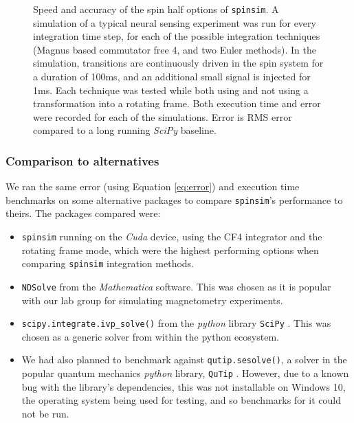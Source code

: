 \documentclass{jors}
\begin{document}
\begin{figure}[h!]
\begin{subfigure}[b]{0.475\textwidth}
					\caption{}
					\label{fig:benchmark_spin_half_execution_error}
				\end{subfigure}
				\caption{Speed and accuracy of the spin half options of \texttt{spinsim}. A simulation of a typical neural sensing experiment was run for every integration time step, for each of the possible integration techniques (Magnus based commutator free 4, and two Euler methods). In the simulation, transitions are continuously driven in the spin system for a duration of 100ms, and an additional small signal is injected for 1ms. Each technique was tested while both using and not using a transformation into a rotating frame. Both execution time and error were recorded for each of the simulations. Error is RMS error compared to a long running \emph{SciPy} baseline.}
				\label{fig:benchmark_spin_half}
			\end{figure}

		\subsubsection{Comparison to alternatives}
			We ran the same error (using Equation \eqref{eq:error}) and execution time benchmarks on some alternative packages to compare \texttt{spinsim}'s performance to theirs. The packages compared were:
			\begin{itemize}
				\item \texttt{spinsim} running on the \emph{Cuda} device, using the CF4 integrator and the rotating frame mode, which were the highest performing options when comparing \texttt{spinsim} integration methods.
				\item \texttt{NDSolve} from the \emph{Mathematica} \cite{wolfram_research_inc_mathematica_2020} software. This was chosen as it is popular with our lab group for simulating magnetometry experiments.
				\item \texttt{scipy.integrate.ivp\_solve()} from the \emph{python} library \texttt{SciPy} \cite{virtanen_scipy_2020}. This was chosen as a generic solver from within the python ecosystem.
				\item We had also planned to benchmark against \texttt{qutip.sesolve()}, a solver in the popular quantum mechanics \emph{python} library, \texttt{QuTip} \cite{johansson_qutip_2013}. However, due to a known bug with the library’s dependencies, this was not installable on Windows 10, the operating system being used for testing, and so benchmarks for it could not be run.
			\end{itemize}
\end{document}

